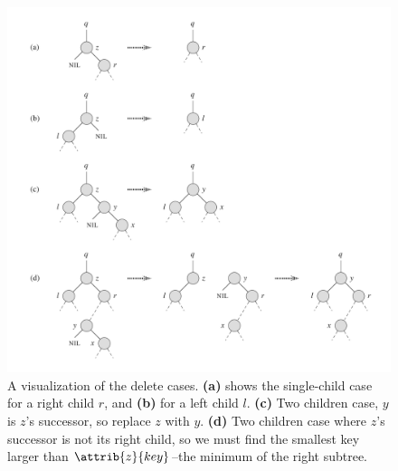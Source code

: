 \documentclass{article}
\begin{document}
\begin{figure}[!ht]
\includegraphics[scale=0.5]{bst_delete_cases}
\caption{
    A visualization of the delete cases.
    \textbf{(a)} shows the single-child case for a right child $r$, and \textbf{(b)} for a left child $l$.
    \textbf{(c)} Two children case, $y$ is $z$'s successor, so replace $z$ with $y$.
    \textbf{(d)} Two children case where $z$'s successor is not its right child, so we must find the smallest key larger than $\attrib{z}{key}$--the minimum of the right subtree.
}
\label{fig:bst_delete}
\end{figure}
\end{document}
